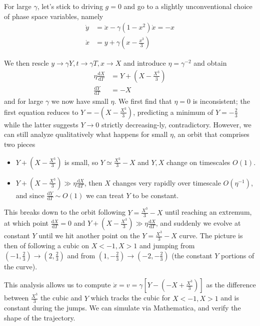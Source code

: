 \documentclass[10pt]{article}
\newcommand{\rd}[2]{\frac{\mathrm{d}#1}{\mathrm{d}#2}}
\begin{document}
For large $\gamma$, let's stick to driving $g=0$ and go to a slightly
unconventional choice of phase space variables, namely
\begin{align}
    \dot{y} &= \ddot{x} - \gamma(1-x^2)\dot{x} = -x\\
    \dot{x} &= y + \gamma\left( x - \frac{x^3}{3} \right)
\end{align}

We then rescle $y \to \gamma Y, t \to \gamma T, x \to X$ and introduce $\eta =
\gamma^{-2}$ and obtain
\begin{align}
    \eta \rd{X}{T} &= Y + \left( X - \frac{X^3}{3} \right)\\
    \rd{Y}{T} &= -X
\end{align}
and for large $\gamma$ we now have small $\eta$. We first find that $\eta = 0$
is inconsistent; the first equation reduces to $Y = -\left( X - \frac{X^3}{3}
\right)$, predicting a minimum of $Y = -\frac{2}{3}$ while the latter suggests
$Y \to 0$ strictly decreasing-ly, contradictory. However, we can still analyze
qualitatively what happens for small $\eta$, an orbit that comprises two pieces
\begin{itemize}
    \item $Y + \left( X - \frac{X^3}{3} \right)$ is small, so $Y \simeq
        \frac{X^3}{3} - X$ and $Y, X$ change on timescales $O(1)$.
    \item $Y + \left( X - \frac{X^3}{3} \right) \gg \eta\rd{X}{T}$, then $X$
        changes very rapidly over timescale $O(\eta^{-1})$, and since $\rd{Y}{T}
        \sim O(1)$ we can treat $Y$ to be constant.
\end{itemize}

This breaks down to the orbit following $Y = \frac{X^3}{3} - X$ until reaching
an extremum, at which point $\rd{X}{T} = 0$ and $Y + \left( X - \frac{X^3}{3}
\right) \gg \eta \rd{X}{T}$, and suddenly we evolve at constant $Y$ until we hit
another point on the $Y = \frac{X^3}{3} - X$ curve. The picture is then of
following a cubic on $X < -1, X > 1$ and jumping from $\left(-1,
\frac{2}{3}\right) \to \left( 2, \frac{2}{3} \right)$ and from $\left( 1,
-\frac{2}{3} \right)\to \left( -2, -\frac{2}{3} \right)$ (the constant $Y$
portions of the curve).

This analysis allows us to compute $\dot{x} = v = \gamma\left[ Y - \left( -X +
\frac{X^3}{3} \right) \right]$ as the difference between $\frac{X^3}{3}$ the
cubic and $Y$ which tracks the cubic for $X < -1, X > 1$ and is constant during
the jumps. We can simulate via Mathematica, and verify the shape of the
trajectory.
\end{document}
